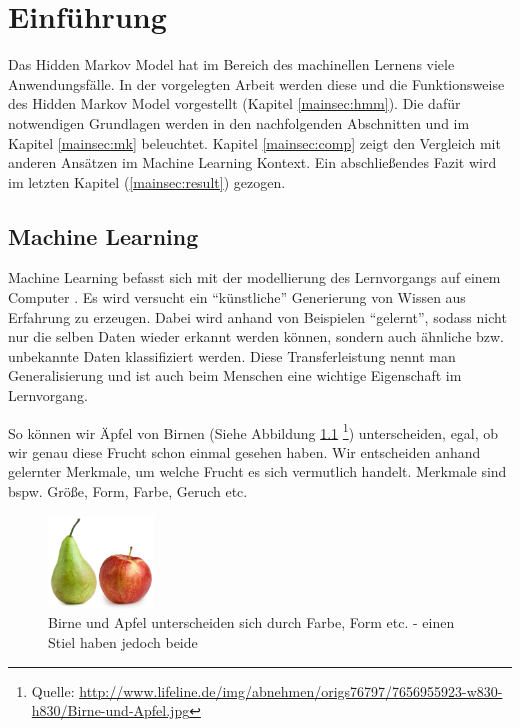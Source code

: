 \chapter{Einführung}

\label{chap:intro}

Das Hidden Markov Model hat im Bereich des machinellen Lernens viele Anwendungsfälle. In der vorgelegten Arbeit werden diese und die  Funktionsweise des Hidden Markov Model vorgestellt (Kapitel \ref{mainsec:hmm}). Die dafür notwendigen Grundlagen werden in den nachfolgenden Abschnitten und im Kapitel \ref{mainsec:mk} beleuchtet.
Kapitel \ref{mainsec:comp} zeigt den Vergleich mit anderen Ansätzen im Machine Learning Kontext. Ein abschließendes Fazit wird im letzten Kapitel (\ref{mainsec:result}) gezogen.

\section{Machine Learning}
Machine Learning befasst sich mit der modellierung des Lernvorgangs auf einem Computer \cite{marsland}. Es wird versucht ein ``künstliche'' Generierung von Wissen aus Erfahrung zu erzeugen.
Dabei wird anhand von Beispielen ``gelernt'', sodass nicht nur die selben Daten wieder erkannt werden können, sondern auch ähnliche bzw. unbekannte Daten klassifiziert werden. Diese Transferleistung nennt man Generalisierung und ist auch beim Menschen eine wichtige Eigenschaft im Lernvorgang.

So können wir Äpfel von Birnen (Siehe Abbildung \ref{fig:apfelbirne} \footnote{Quelle: \url{http://www.lifeline.de/img/abnehmen/origs76797/7656955923-w830-h830/Birne-und-Apfel.jpg}}) unterscheiden, egal, ob wir genau diese Frucht schon einmal gesehen haben. Wir entscheiden anhand gelernter Merkmale, um welche Frucht es sich vermutlich handelt. Merkmale sind bspw. Größe, Form, Farbe, Geruch etc.

\begin{figure}[htbp] \centering
    \includegraphics[width=0.25\textwidth]{Bilder/Kap1/birneapfel}
    \caption{ Birne und Apfel unterscheiden sich durch Farbe, Form etc. - einen Stiel haben jedoch beide}
    \label{fig:apfelbirne}
\end{figure}


